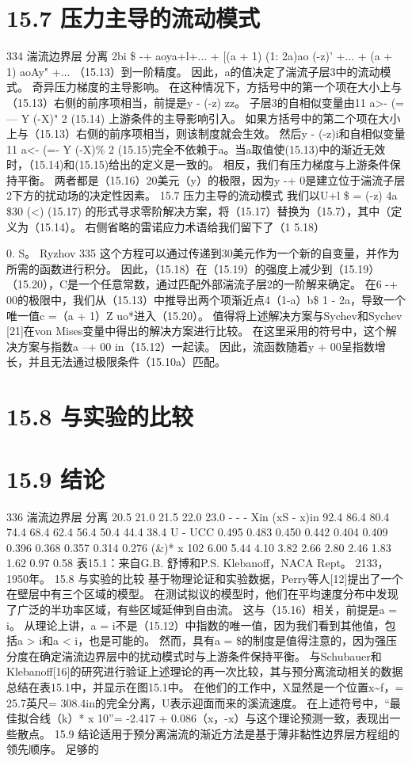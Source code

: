 \documentclass[UTF8,11pt,a4paper,openany,fontset=fandol]{ctexbook}
\begin{document}
\section{15.7 压力主导的流动模式}
334 湍流边界层 分离 2bi \$ -+ aoya+l+... + [(a + 1) (1: 2a)ao (-z)' +... + (a + 1) aoAy" +... （15.13）到一阶精度。 因此，a的值决定了湍流子层3中的流动模式。 奇异压力梯度的主导影响。 在这种情况下，方括号中的第一个项在大小上与（15.13）右侧的前序项相当，前提是y - (-z) zz。 子层3的自相似变量由11 a>- (=--- Y (-X)" 2 (15.14) 上游条件的主导影响引入。 如果方括号中的第二个项在大小上与（15.13）右侧的前序项相当，则该制度就会生效。 然后y - (-z)i和自相似变量11 a<- (=- Y (-X)\% 2 (15.15)完全不依赖于a。当a取值使(15.13)中的渐近无效时，（15.14)和(15.15)给出的定义是一致的。 相反，我们有压力梯度与上游条件保持平衡。 两者都是（15.16）20美元（y）的极限，因为y -+ 0是建立位于湍流子层2下方的扰动场的决定性因素。 15.7 压力主导的流动模式 我们以U+l \$ = (-z) 4a \$30 (<) (15.17) 的形式寻求零阶解决方案，将（15.17）替换为（15.7），其中（定义为（15.14）。 右侧省略的雷诺应力术语给我们留下了（1 5.18）

0. S。 Ryzhov 335 这个方程可以通过传递到30美元作为一个新的自变量，并作为所需的函数进行积分。 因此，（15.18）在（15.19）的强度上减少到（15.19）（15.20），C是一个任意常数，通过匹配外部湍流子层2的一阶解来确定。 在6 -+ 00的极限中，我们从（15.13）中推导出两个项渐近点4（1-a）b\$ 1 - 2a，导致一个唯一值c =（a + 1）Z uo*进入（15.20）。 值得将上述解决方案与Sychev和Sychev [21]在von Mises变量中得出的解决方案进行比较。 在这里采用的符号中，这个解决方案与指数a --+ 00 in（15.12）一起读。 因此，流函数随着y + 00呈指数增长，并且无法通过极限条件（15.10a）匹配。

\section{15.8 与实验的比较}
\section{15.9 结论}
336 湍流边界层 分离 20.5 21.0 21.5 22.0 23.0 - - - Xin (xS - x)in 92.4 86.4 80.4 74.4 68.4 62.4 56.4 50.4 44.4 38.4 U - UCC 0.495 0.483 0.450 0.442 0.404 0.409 0.396 0.368 0.357 0.314 0.276 (\&)* x 102 6.00 5.44 4.10 3.82 2.66 2.80 2.46 1.83 1.62 0.97 0.58 表15.1：来自G.B. 舒博和P.S. Klebanoff，NACA Rept。 2133，1950年。 15.8 与实验的比较 基于物理论证和实验数据，Perry等人[12]提出了一个在壁层中有三个区域的模型。 在测试拟议的模型时，他们在平均速度分布中发现了广泛的半功率区域，有些区域延伸到自由流。 这与（15.16）相关，前提是a = i。 从理论上讲，a = i不是（15.12）中指数的唯一值，因为我们看到其他值，包括a > i和a < i，也是可能的。 然而，具有a = \$的制度是值得注意的，因为强压分度在确定湍流边界层中的扰动模式时与上游条件保持平衡。 与Schubauer和Klebanoff[16]的研究进行验证上述理论的再一次比较，其与预分离流动相关的数据总结在表15.1中，并显示在图15.1中。 在他们的工作中，X显然是一个位置x\textasciitilde{}f，= 25.7英尺= 308.4in的完全分离，U表示迎面而来的溪流速度。 在上述符号中，“最佳拟合线（k）* x 10”= -2.417 + 0.086（x，-x）与这个理论预测一致，表现出一些散点。 15.9 结论适用于预分离湍流的渐近方法是基于薄非黏性边界层方程组的领先顺序。 足够的
\end{document}
